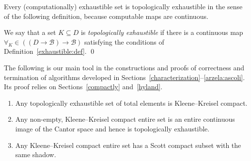 \documentclass{LMCS}
\newcommand{\pBool}{\mathcal{B}}
\begin{document}
Every (computationally) exhaustible set is topologically exhaustible
in the sense of the following definition, because computable maps are
continuous.
\begin{defi} \label{topologically:exhaustible} \leavevmode
We say that a set $K \subseteq D$ is \emph{topologically
    exhaustible} if there is a continuous map $\forall_K \in ((D \to
  \pBool) \to \pBool)$ satisfying the conditions of
  Definition~\ref{exhaustible:def}. \qed
\end{defi}
\noindent The following is our main tool in the constructions and
proofs of correctness and termination of algorithms developed in
Sections~\ref{characterization}--\ref{arzela:ascoli}.  Its proof relies on
Sections~\ref{compactly} and~\ref{hyland}.  \pagebreak[3]
\begin{lem} \label{lemma:criterion} \leavevmode 
  \begin{enumerate}
  \item \label{lemma:criterion:1} Any topologically
    exhaustible set of total elements is Kleene--Kreisel compact.

  \item \label{lemma:criterion:2} Any non-empty, Kleene--Kreisel
    compact entire set is an entire continuous image of the Cantor
    space and hence is topologically exhaustible.



  \item \label{lemma:criterion:3} Any Kleene--Kreisel compact entire
    set has a Scott compact subset with the same shadow.
  \end{enumerate}
\end{lem}
\pagebreak[3]
\end{document}
